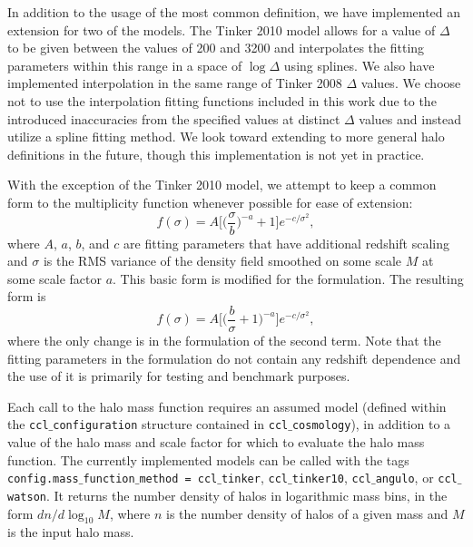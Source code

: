 \documentclass[\docopts]{\docclass}
\begin{document}
In addition to the usage of the most common definition, we have implemented an extension for two of the models. The Tinker 2010 model allows for a value of $\Delta$ to be given between the values of 200 and 3200 and interpolates the fitting parameters within this range in a space of $\log \Delta$ using splines. We also have implemented interpolation in the same range of Tinker 2008 $\Delta$ values. We choose not to use the interpolation fitting functions included in this work due to the introduced inaccuracies from the specified values at distinct $\Delta$ values and instead utilize a spline fitting method. We look toward extending to more general halo definitions in the future, though this implementation is not yet in practice.


With the exception of the Tinker 2010 model, we attempt to keep a common form to the multiplicity function whenever possible for ease of extension:
\begin{equation}
f(\sigma)=A\Big[\Big(\frac{\sigma}{b}\Big)^{-a}+1\Big]e^{-c/{\sigma}^2},
\end{equation}
where $A$, $a$, $b$, and $c$ are fitting parameters that have additional redshift scaling and $\sigma$ is the RMS variance of the density field smoothed on some scale $M$ at some scale factor $a$. This basic form is modified for the \citet{Angulo2012} formulation. The resulting form is
\begin{equation}
f(\sigma)=A\Big[\Big(\frac{b}{\sigma}+1\Big)^{-a}\Big]e^{-c/{\sigma}^2},
\end{equation}
where the only change is in the formulation of the second term. Note that the fitting parameters in the \citet{Angulo2012} formulation do not contain any redshift dependence and the use of it is primarily for testing and benchmark purposes.

Each call to the halo mass function requires an assumed model (defined within the {\tt ccl$\_$configuration} structure contained in {\tt ccl$\_$cosmology}), in addition to a value of the halo mass and scale factor for which to evaluate the halo mass function. The currently implemented models can be called with the tags {\tt config.mass$\_$function$\_$method = ccl$\_$tinker}, {\tt ccl$\_$tinker10}, {\tt ccl$\_$angulo}, or {\tt ccl$\_$watson}. It returns the number density of halos in logarithmic mass bins, in the form $dn/d\log_{10}{M}$, where $n$ is the number density of halos of a given mass and $M$ is the input halo mass.
\end{document}
